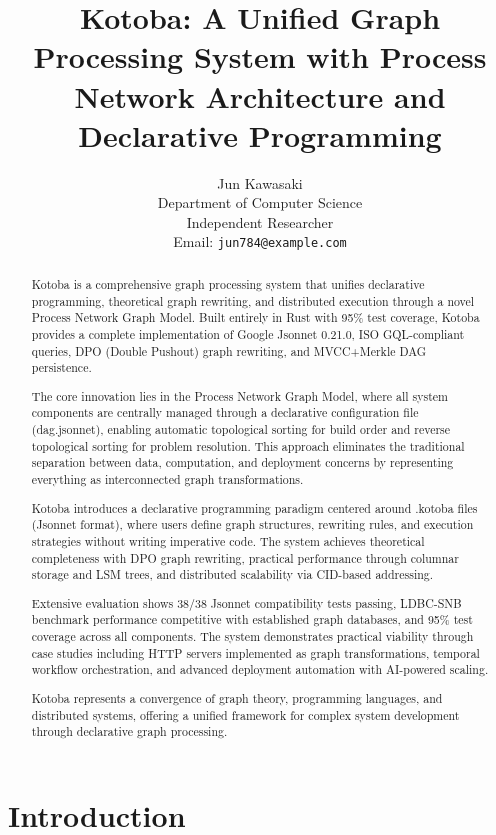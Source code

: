 \documentclass[11pt,a4paper]{article}
\title{Kotoba: A Unified Graph Processing System with Process Network Architecture and Declarative Programming}
\author{
Jun Kawasaki \\
Department of Computer Science \\
Independent Researcher \\
Email: \texttt{jun784@example.com}
}
\begin{document}
\maketitle

\begin{abstract}
Kotoba is a comprehensive graph processing system that unifies declarative programming, theoretical graph rewriting, and distributed execution through a novel Process Network Graph Model. Built entirely in Rust with 95\% test coverage, Kotoba provides a complete implementation of Google Jsonnet 0.21.0, ISO GQL-compliant queries, DPO (Double Pushout) graph rewriting, and MVCC+Merkle DAG persistence.

The core innovation lies in the Process Network Graph Model, where all system components are centrally managed through a declarative configuration file (dag.jsonnet), enabling automatic topological sorting for build order and reverse topological sorting for problem resolution. This approach eliminates the traditional separation between data, computation, and deployment concerns by representing everything as interconnected graph transformations.

Kotoba introduces a declarative programming paradigm centered around .kotoba files (Jsonnet format), where users define graph structures, rewriting rules, and execution strategies without writing imperative code. The system achieves theoretical completeness with DPO graph rewriting, practical performance through columnar storage and LSM trees, and distributed scalability via CID-based addressing.

Extensive evaluation shows 38/38 Jsonnet compatibility tests passing, LDBC-SNB benchmark performance competitive with established graph databases, and 95\% test coverage across all components. The system demonstrates practical viability through case studies including HTTP servers implemented as graph transformations, temporal workflow orchestration, and advanced deployment automation with AI-powered scaling.

Kotoba represents a convergence of graph theory, programming languages, and distributed systems, offering a unified framework for complex system development through declarative graph processing.
\end{abstract}

\section{Introduction}
\label{sec:introduction}
\end{document}

